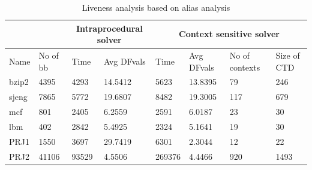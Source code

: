 \documentclass[12pt]{report}
\begin{document}
\begin {table}[H]
\label{tab:specclive} 
\begin{flushleft}
\begin{tabular}{|l | l | l | p{2.3cm} | l | p{2.3cm} | p{1.4cm} | p{1.2cm} | }
  \hline                        
  \multicolumn{2}{|c|}{} &
  \multicolumn{2}{|c|}{Intraprocedural solver} &
  \multicolumn{4}{|c|}{Context sensitive solver} \\
  \hline
  Name & No of bb & Time & Avg DFvals &  Time  & Avg DFvals    & No of \newline contexts  & Size of \newline CTD \\  \hline  
  bzip2& 4395     & 4293 &  14.5412   & 5623   & 13.8395       & 79                       & 246                  \\ \hline  
  sjeng& 7865     & 5772 &  19.6807   & 8482   & 19.3005       & 117                      & 679                  \\  \hline  
  mcf  & 801      & 2405 &  6.2559    & 2591   & 6.0187        & 23                       & 30                   \\  \hline
  lbm  & 402      & 2842 &  5.4925    & 2324   & 5.1641        & 19                       & 30                   \\  \hline
  PRJ1 & 1550     & 3697 &  29.7419   & 6301   & 2.3044        & 12                       & 22                   \\  \hline
  PRJ2 & 41106    & 93529&  4.5506    & 269376 & 4.4466        & 920                      & 1493                 \\  \hline  
\end{tabular}
\end{flushleft}
\caption {Liveness analysis based on alias analysis}
\end {table}
\end{document}
